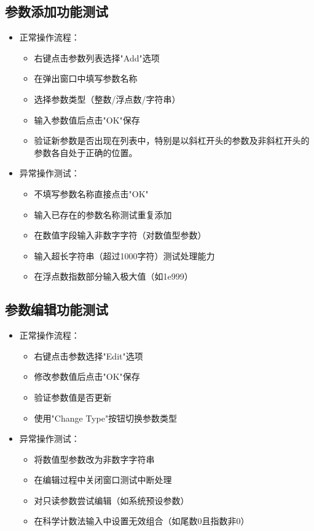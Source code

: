 \documentclass[a4paper,12pt]{report}	%
\begin{document}
\subsection{参数添加功能测试}
\begin{itemize}
    \item 正常操作流程：
    \begin{itemize}
        \item 右键点击参数列表选择"Add"选项
        \item 在弹出窗口中填写参数名称
        \item 选择参数类型（整数/浮点数/字符串）
        \item 输入参数值后点击"OK"保存
        \item 验证新参数是否出现在列表中，特别是以斜杠开头的参数及非斜杠开头的参数各自处于正确的位置。
    \end{itemize}
    
    \item 异常操作测试：
    \begin{itemize}
        \item 不填写参数名称直接点击"OK"
        \item 输入已存在的参数名称测试重复添加
        \item 在数值字段输入非数字字符（对数值型参数）
        \item 输入超长字符串（超过1000字符）测试处理能力
        \item 在浮点数指数部分输入极大值（如1e999）
    \end{itemize}
\end{itemize}

\subsection{参数编辑功能测试}
\begin{itemize}
    \item 正常操作流程：
    \begin{itemize}
        \item 右键点击参数选择"Edit"选项
        \item 修改参数值后点击"OK"保存
        \item 验证参数值是否更新
        \item 使用"Change Type"按钮切换参数类型
    \end{itemize}
    
    \item 异常操作测试：
    \begin{itemize}
        \item 将数值型参数改为非数字字符串
        \item 在编辑过程中关闭窗口测试中断处理
        \item 对只读参数尝试编辑（如系统预设参数）
        \item 在科学计数法输入中设置无效组合（如尾数0且指数非0）
    \end{itemize}
\end{itemize}
\end{document}
